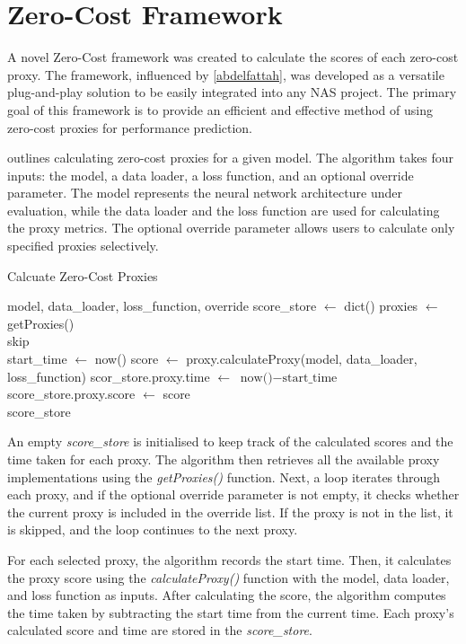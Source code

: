 \section{Zero-Cost Framework}\label{sec:zc-framework}

A novel Zero-Cost framework was created to calculate the scores of each zero-cost proxy. The framework, influenced by \cref{abdelfattah}, was developed as a versatile plug-and-play solution to be easily integrated into any \gls{NAS} project. The primary goal of this framework is to provide an efficient and effective method of using zero-cost proxies for performance prediction.

 outlines calculating zero-cost proxies for a given model. The algorithm takes four inputs: the model, a data loader, a loss function, and an optional override parameter. The model represents the neural network architecture under evaluation, while the data loader and the loss function are used for calculating the proxy metrics. The optional override parameter allows users to calculate only specified proxies selectively.

\begin{algorithm}[htbp]
    \begin{algorithmic}[1]
        \caption{Calcuate Zero-Cost Proxies}\label{alg:zc_framework}
        \Require model, data\_loader, loss\_function, override
        \State score\_store $\gets$ dict()
        \State proxies $\gets$ getProxies() 
        \\
                    \State skip
                \EndIf
            \EndIf
            \\
            \State start\_time $\gets$ now()
            \State score $\gets$ proxy.calculateProxy(model, data\_loader, loss\_function)
            \State scor\_store.proxy.time $\gets$ $\text{now()}-\text{start\_time}$
            \State score\_store.proxy.score $\gets$ score
        \EndFor
        \\
        \State \Return score\_store
        
    \end{algorithmic}
\end{algorithm}

An empty \textit{score\_store} is initialised to keep track of the calculated scores and the time taken for each proxy. The algorithm then retrieves all the available proxy implementations using the \textit{getProxies()} function. Next, a loop iterates through each proxy, and if the optional override parameter is not empty, it checks whether the current proxy is included in the override list. If the proxy is not in the list, it is skipped, and the loop continues to the next proxy.

For each selected proxy, the algorithm records the start time. Then, it calculates the proxy score using the \textit{calculateProxy()} function with the model, data loader, and loss function as inputs. After calculating the score, the algorithm computes the time taken by subtracting the start time from the current time. Each proxy's calculated score and time are stored in the \textit{score\_store}.

